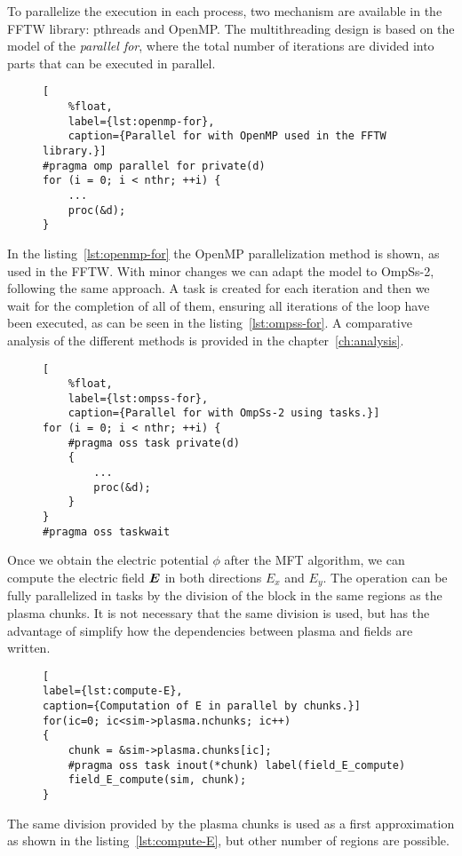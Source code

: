 To parallelize the execution in each process, two mechanism are available in the 
FFTW library: pthreads and OpenMP. The multithreading design is based on the 
model of the \textit{parallel for}, where the total number of iterations are 
divided into parts that can be executed in parallel.
%
\begin{figure}[ht]%
\begin{lstlisting}[
	%float,
	label={lst:openmp-for},
	caption={Parallel for with OpenMP used in the FFTW library.}]
#pragma omp parallel for private(d)
for (i = 0; i < nthr; ++i) {
	...
	proc(&d);
}
\end{lstlisting}
\end{figure}%
%
In the listing~\ref{lst:openmp-for} the OpenMP parallelization method is shown, 
as used in the FFTW. With minor changes we can adapt the model to OmpSs-2, 
following the same approach. A task is created for each iteration and then we 
wait for the completion of all of them, ensuring all iterations of the loop have 
been executed, as can be seen in the listing~\ref{lst:ompss-for}. A comparative 
analysis of the different methods is provided in the chapter~\ref{ch:analysis}.
%
\begin{figure}[ht]%
\begin{lstlisting}[
	%float,
	label={lst:ompss-for},
	caption={Parallel for with OmpSs-2 using tasks.}]
for (i = 0; i < nthr; ++i) {
	#pragma oss task private(d)
	{
		...
		proc(&d);
	}
}
#pragma oss taskwait
\end{lstlisting}
\end{figure}%
%

Once we obtain the electric potential $\phi$ after the MFT algorithm, we can 
compute the electric field $\bm{E}$ in both directions $E_x$ and $E_y$. The 
operation can be fully parallelized in tasks by the division of the block in the 
same regions as the plasma chunks. It is not necessary that the same division is 
used, but has the advantage of simplify how the dependencies between plasma and 
fields are written.
%
\begin{figure}[ht]%
\begin{lstlisting}[
label={lst:compute-E},
caption={Computation of E in parallel by chunks.}]
for(ic=0; ic<sim->plasma.nchunks; ic++)
{
	chunk = &sim->plasma.chunks[ic];
	#pragma oss task inout(*chunk) label(field_E_compute)
	field_E_compute(sim, chunk);
}
\end{lstlisting}
\end{figure}%
%
The same division provided by the plasma chunks is used as a first approximation 
as shown in the listing~\ref{lst:compute-E}, but other number of regions are 
possible.

